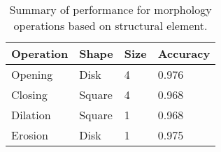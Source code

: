 \begin{table}[H]
\centering
\caption{Summary of performance for morphology operations based on structural element.}

\begin{tabular}{|l|l|l|l|}
\hline
\textbf{Operation} &	\textbf{Shape} & \textbf{Size} & \textbf{Accuracy}\\
\hline
Opening & Disk  & 4  & 0.976\\
\hline				    	 			
Closing & Square & 4  & 0.968\\	
\hline
Dilation & Square & 1 & 0.968\\
\hline
Erosion & Disk & 1 & 0.975\\		    	 
\hline 
\end{tabular}
\label{table:morphres}
\end{table}
